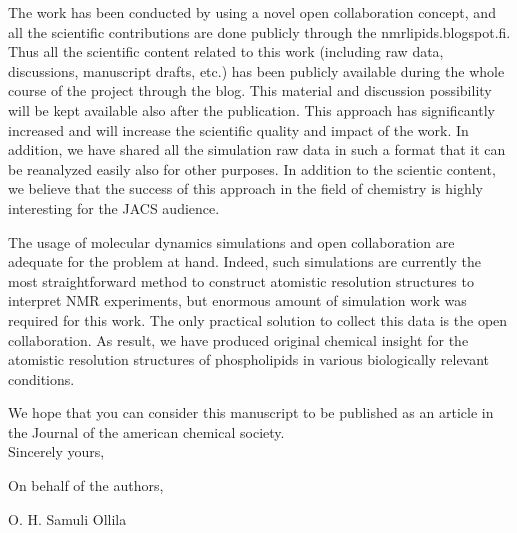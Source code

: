 \documentclass[12pt]{letter}
\begin{document}
The work has been conducted by using a novel open collaboration concept, and all the scientific contributions
are done publicly through the nmrlipids.blogspot.fi. Thus all the scientific content related to this work
(including raw data, discussions, manuscript drafts, etc.)
has been publicly available during the whole course of the project through the blog. This material and discussion possibility
will be kept available also after the publication. This approach has significantly increased and will increase the scientific
quality and impact of the work. In addition, we have shared all the simulation raw data in such a format
that it can be reanalyzed easily also for other purposes. In addition to the scientic content,
we believe that the success of this approach in the field of chemistry is highly interesting 
for the JACS audience.

The usage of molecular dynamics simulations and open collaboration are adequate for the
problem at hand. Indeed, such simulations are currently the most straightforward method to 
construct atomistic resolution structures to interpret NMR experiments, but
enormous amount of simulation work was required for this work. The only practical
solution to collect this data is the open collaboration.
As result, we have produced original chemical insight for the atomistic resolution 
structures of phospholipids in various biologically relevant conditions.

We hope that you can consider this manuscript to be published as an article in the Journal of the american chemical society. \\




Sincerely yours,

On behalf of the authors,

O. H. Samuli Ollila
\end{document}
